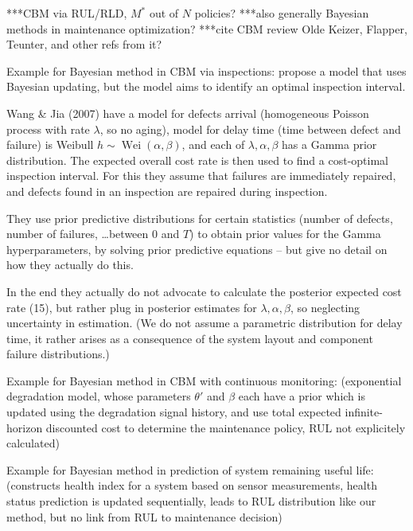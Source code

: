 \documentclass[authoryear]{elsarticle}
\newcommand{\wei}{\operatorname{Wei}} %
\begin{document}
\iffalse
***CBM via RUL/RLD, $M^*$ out of $N$ policies?
***also generally Bayesian methods in maintenance optimization?
***cite CBM review Olde Keizer, Flapper, Teunter, and other refs from it?

Example for Bayesian method in CBM via inspections: \cite{2007:wang-jia}
propose a model that uses Bayesian updating,
but the model aims to identify an optimal inspection interval.

\begin{scriptsize}
Wang \& Jia (2007) have a model for defects arrival (homogeneous Poisson process with rate $\lambda$, so no aging),
model for delay time (time between defect and failure) is Weibull $h \sim \wei(\alpha,\beta)$,
and each of $\lambda, \alpha, \beta$ has a Gamma prior distribution.
The expected overall cost rate is then used to find a cost-optimal inspection interval.
For this they assume that failures are immediately repaired,
and defects found in an inspection are repaired during inspection.

They use prior predictive distributions for certain statistics (number of defects, number of failures, \ldots between $0$ and $T$)
to obtain prior values for the Gamma hyperparameters,
by solving prior predictive equations -- but give no detail on how they actually do this.

In the end they actually do not advocate to calculate the posterior expected cost rate (15),
but rather plug in posterior estimates for $\lambda, \alpha, \beta$,
so neglecting uncertainty in estimation.
(We do not assume a parametric distribution for delay time,
it rather arises as a consequence of the system layout and component failure distributions.)

\end{scriptsize}

Example for Bayesian method in CBM with continuous monitoring: \cite{2011:elwany-et-al}
(exponential degradation model, whose parameters $\theta'$ and $\beta$ each have a prior
which is updated using the degradation signal history,
and use total expected infinite-horizon discounted cost to determine the maintenance policy,
RUL not explicitely calculated)

Example for Bayesian method in prediction of system remaining useful life: \cite{2012:sun-et-al}
(constructs health index for a system based on sensor measurements,
health status prediction is updated sequentially,
leads to RUL distribution like our method,
but no link from RUL to maintenance decision)
\end{document}
